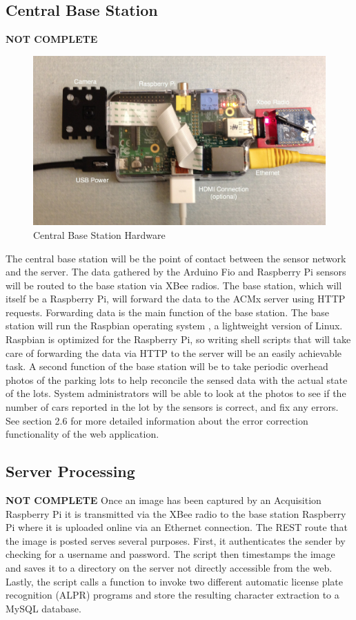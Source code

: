 \documentclass[11pt, oneside, fullpage, doublespace]{article}
\begin{document}
\subsection{Central Base Station}
{\color{red}\textbf{NOT COMPLETE}}
\begin{figure}
\begin{center}
\includegraphics[width=4.5in]{basestation}
\end{center}
\caption{Central Base Station Hardware}
\label{fig:basestation}
\end{figure}
The central base station will be the point of contact between the sensor network and the server. The data gathered by the Arduino Fio and Raspberry Pi sensors will be routed to the base station via XBee radios. The base station, which will itself be a Raspberry Pi, will forward the data to the ACMx server using HTTP requests. Forwarding data is the main function of the base station. The base station will run the Raspbian operating system \cite{raspbian}, a lightweight version of Linux. Raspbian is optimized for the Raspberry Pi, so writing shell scripts that will take care of forwarding the data via HTTP to the server will be an easily achievable task. A second function of the base station will be to take periodic overhead photos of the parking lots to help reconcile the sensed data with the actual state of the lots. System administrators will be able to look at the photos to see if the number of cars reported in the lot by the sensors is correct, and fix any errors. See section 2.6 for more detailed information about the error correction functionality of the web application.


\subsection{Server Processing}
{\color{red}\textbf{NOT COMPLETE}}
Once an image has been captured by an Acquisition Raspberry Pi it is transmitted via the XBee radio to the base station Raspberry Pi where it is uploaded online via an Ethernet connection. The REST route that the image is posted serves several purposes. First, it authenticates the sender by checking for a username and password. The script then timestamps the image and saves it to a directory on the server not directly accessible from the web. Lastly, the script calls a function to invoke two different automatic license plate recognition (ALPR) programs and store the resulting character extraction to a MySQL database.
\end{document}
